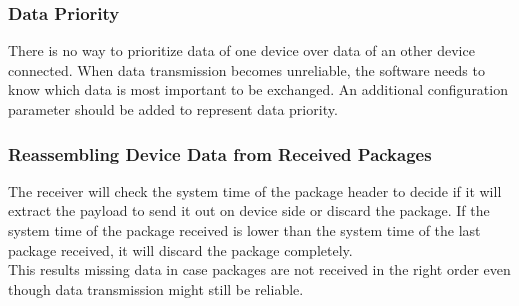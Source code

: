 \subsubsection{Data Priority}
There is no way to prioritize data of one device over data of an other device connected. When data transmission becomes unreliable, the software needs to know which data is most important to be exchanged. An additional configuration parameter should be added to represent data priority.\\
%
\subsubsection{Reassembling Device Data from Received Packages}
The receiver will check the system time of the package header to decide if it will extract the payload to send it out on device side or discard the package. If the system time of the package received is lower than the system time of the last package received, it will discard the package completely.\\
This results missing data in case packages are not received in the right order even though data transmission might still be reliable.